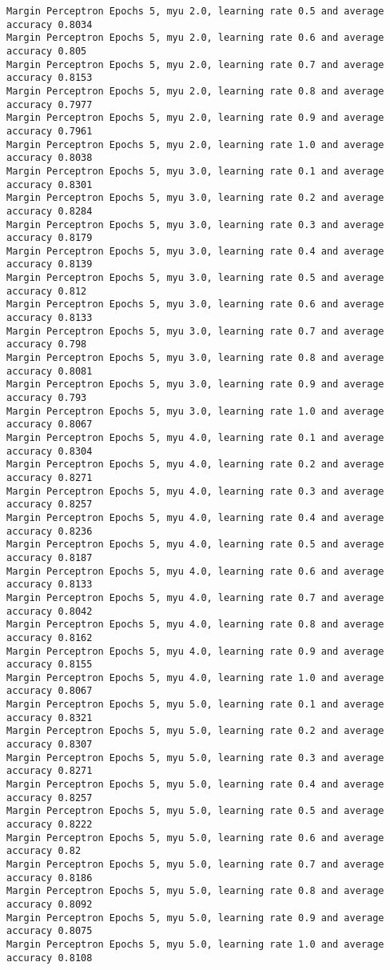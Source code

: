 \begin{Verbatim}[fontsize=\small]
Margin Perceptron Epochs 5, myu 2.0, learning rate 0.5 and average accuracy 0.8034
Margin Perceptron Epochs 5, myu 2.0, learning rate 0.6 and average accuracy 0.805
Margin Perceptron Epochs 5, myu 2.0, learning rate 0.7 and average accuracy 0.8153
Margin Perceptron Epochs 5, myu 2.0, learning rate 0.8 and average accuracy 0.7977
Margin Perceptron Epochs 5, myu 2.0, learning rate 0.9 and average accuracy 0.7961
Margin Perceptron Epochs 5, myu 2.0, learning rate 1.0 and average accuracy 0.8038
Margin Perceptron Epochs 5, myu 3.0, learning rate 0.1 and average accuracy 0.8301
Margin Perceptron Epochs 5, myu 3.0, learning rate 0.2 and average accuracy 0.8284
Margin Perceptron Epochs 5, myu 3.0, learning rate 0.3 and average accuracy 0.8179
Margin Perceptron Epochs 5, myu 3.0, learning rate 0.4 and average accuracy 0.8139
Margin Perceptron Epochs 5, myu 3.0, learning rate 0.5 and average accuracy 0.812
Margin Perceptron Epochs 5, myu 3.0, learning rate 0.6 and average accuracy 0.8133
Margin Perceptron Epochs 5, myu 3.0, learning rate 0.7 and average accuracy 0.798
Margin Perceptron Epochs 5, myu 3.0, learning rate 0.8 and average accuracy 0.8081
Margin Perceptron Epochs 5, myu 3.0, learning rate 0.9 and average accuracy 0.793
Margin Perceptron Epochs 5, myu 3.0, learning rate 1.0 and average accuracy 0.8067
Margin Perceptron Epochs 5, myu 4.0, learning rate 0.1 and average accuracy 0.8304
Margin Perceptron Epochs 5, myu 4.0, learning rate 0.2 and average accuracy 0.8271
Margin Perceptron Epochs 5, myu 4.0, learning rate 0.3 and average accuracy 0.8257
Margin Perceptron Epochs 5, myu 4.0, learning rate 0.4 and average accuracy 0.8236
Margin Perceptron Epochs 5, myu 4.0, learning rate 0.5 and average accuracy 0.8187
Margin Perceptron Epochs 5, myu 4.0, learning rate 0.6 and average accuracy 0.8133
Margin Perceptron Epochs 5, myu 4.0, learning rate 0.7 and average accuracy 0.8042
Margin Perceptron Epochs 5, myu 4.0, learning rate 0.8 and average accuracy 0.8162
Margin Perceptron Epochs 5, myu 4.0, learning rate 0.9 and average accuracy 0.8155
Margin Perceptron Epochs 5, myu 4.0, learning rate 1.0 and average accuracy 0.8067
Margin Perceptron Epochs 5, myu 5.0, learning rate 0.1 and average accuracy 0.8321
Margin Perceptron Epochs 5, myu 5.0, learning rate 0.2 and average accuracy 0.8307
Margin Perceptron Epochs 5, myu 5.0, learning rate 0.3 and average accuracy 0.8271
Margin Perceptron Epochs 5, myu 5.0, learning rate 0.4 and average accuracy 0.8257
Margin Perceptron Epochs 5, myu 5.0, learning rate 0.5 and average accuracy 0.8222
Margin Perceptron Epochs 5, myu 5.0, learning rate 0.6 and average accuracy 0.82
Margin Perceptron Epochs 5, myu 5.0, learning rate 0.7 and average accuracy 0.8186
Margin Perceptron Epochs 5, myu 5.0, learning rate 0.8 and average accuracy 0.8092
Margin Perceptron Epochs 5, myu 5.0, learning rate 0.9 and average accuracy 0.8075
Margin Perceptron Epochs 5, myu 5.0, learning rate 1.0 and average accuracy 0.8108
\end{Verbatim}

